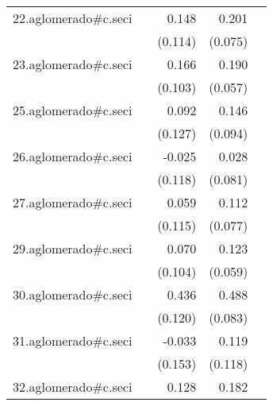 {\begin{longtable}{l*{4}{D{.}{.}{-1}}}
\addlinespace
22.aglomerado#c.seci&                     &       0.148         &       0.201\sym{**} &                     \\
            &                     &     (0.114)         &     (0.075)         &                     \\
\addlinespace
23.aglomerado#c.seci&                     &       0.166         &       0.190\sym{***}&                     \\
            &                     &     (0.103)         &     (0.057)         &                     \\
\addlinespace
25.aglomerado#c.seci&                     &       0.092         &       0.146         &                     \\
            &                     &     (0.127)         &     (0.094)         &                     \\
\addlinespace
26.aglomerado#c.seci&                     &      -0.025         &       0.028         &                     \\
            &                     &     (0.118)         &     (0.081)         &                     \\
\addlinespace
27.aglomerado#c.seci&                     &       0.059         &       0.112         &                     \\
            &                     &     (0.115)         &     (0.077)         &                     \\
\addlinespace
29.aglomerado#c.seci&                     &       0.070         &       0.123\sym{*}  &                     \\
            &                     &     (0.104)         &     (0.059)         &                     \\
\addlinespace
30.aglomerado#c.seci&                     &       0.436\sym{***}&       0.488\sym{***}&                     \\
            &                     &     (0.120)         &     (0.083)         &                     \\
\addlinespace
31.aglomerado#c.seci&                     &      -0.033         &       0.119         &                     \\
            &                     &     (0.153)         &     (0.118)         &                     \\
\addlinespace
32.aglomerado#c.seci&                     &       0.128         &       0.182\sym{*}  &                     \\

\end{longtable}}
